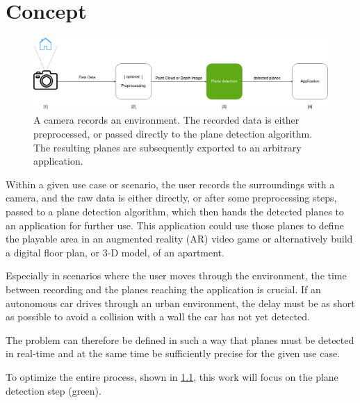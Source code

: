 \documentclass[main.tex]{subfiles}
\begin{document}
\chapter{Concept} \label{chap:Concept}


\begin{figure}[!ht]
    \centering
    \includegraphics[width=15 cm]{images/concept.png}
    \caption[Concept Graphic]{A camera records an environment. The recorded data is either preprocessed, or passed directly to the plane detection algorithm.
        The resulting planes are subsequently exported to an arbitrary application.}
    \label{fig:concept}
\end{figure}



Within a given use case or scenario, the user records the surroundings with a camera, and the raw data is either
directly, or after some preprocessing steps, passed to a plane detection algorithm, which then hands the detected planes to an application for further use.
This application could use those planes to define the playable area in an augmented reality (AR) video game or alternatively build a digital floor
plan, or 3-D model, of an apartment.

Especially in scenarios where the user moves through the environment, the time between recording and the planes reaching the application is crucial.
If an autonomous car drives through an urban environment, the delay must be as short as possible to avoid a collision with a wall the car has not yet detected.

The problem can therefore be defined in such a way that planes must be detected in real-time and at the same time be sufficiently precise for the given use case.

To optimize the entire process, shown in \ref{fig:concept}, this work will focus on the plane detection step (green).
\end{document}
